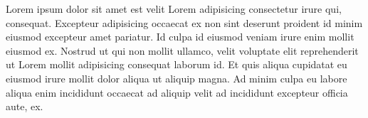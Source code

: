 Lorem ipsum dolor sit amet est velit Lorem adipisicing consectetur irure qui, consequat. Excepteur adipisicing occaecat ex non sint deserunt proident id minim eiusmod excepteur amet pariatur. Id culpa id eiusmod veniam irure enim mollit eiusmod ex. Nostrud ut qui non mollit ullamco, velit voluptate elit reprehenderit ut Lorem mollit adipisicing consequat laborum id. Et quis aliqua cupidatat eu eiusmod irure mollit dolor aliqua ut aliquip magna. Ad minim culpa eu labore aliqua enim incididunt occaecat ad aliquip velit ad incididunt excepteur officia aute, ex.